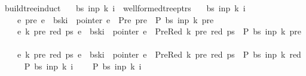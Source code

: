 \begin{isabellebody}
\isadelimproof
%
\endisadelimproof
%
\isatagproof
%
\endisatagproof
{\isafoldproof}%
%
\isadelimproof
\isanewline
%
\endisadelimproof
{}\isamarkupfalse%
\ build{\isacharunderscore}{\kern0pt}tree{\isacharprime}{\kern0pt}{\isacharunderscore}{\kern0pt}induct{\isacharcolon}{\kern0pt}\isanewline
\ \ \ {\isachardoublequoteopen}{\isacharparenleft}{\kern0pt}bs{\isacharcomma}{\kern0pt}\ inp{\isacharcomma}{\kern0pt}\ k{\isacharcomma}{\kern0pt}\ i{\isacharparenright}{\kern0pt}\ {\isasymin}\ wellformed{\isacharunderscore}{\kern0pt}tree{\isacharunderscore}{\kern0pt}ptrs{\isachardoublequoteclose}\isanewline
\ \ \ {\isachardoublequoteopen}{\isasymAnd}bs\ inp\ k\ i{\isachardot}{\kern0pt}\isanewline
\ \ \ \ {\isacharparenleft}{\kern0pt}{\isasymAnd}e\ pre{\isachardot}{\kern0pt}\ e\ {\isacharequal}{\kern0pt}\ bs{\isacharbang}{\kern0pt}k{\isacharbang}{\kern0pt}i\ {\isasymLongrightarrow}\ pointer\ e\ {\isacharequal}{\kern0pt}\ Pre\ pre\ {\isasymLongrightarrow}\ P\ bs\ inp\ {\isacharparenleft}{\kern0pt}k{\isacharminus}{\kern0pt}{}{\isacharparenright}{\kern0pt}\ pre{\isacharparenright}{\kern0pt}\ {\isasymLongrightarrow}\isanewline
\ \ \ \ {\isacharparenleft}{\kern0pt}{\isasymAnd}e\ k{\isacharprime}{\kern0pt}\ pre\ red\ ps{\isachardot}{\kern0pt}\ e\ {\isacharequal}{\kern0pt}\ bs{\isacharbang}{\kern0pt}k{\isacharbang}{\kern0pt}i\ {\isasymLongrightarrow}\ pointer\ e\ {\isacharequal}{\kern0pt}\ PreRed\ {\isacharparenleft}{\kern0pt}k{\isacharprime}{\kern0pt}{\isacharcomma}{\kern0pt}\ pre{\isacharcomma}{\kern0pt}\ red{\isacharparenright}{\kern0pt}\ ps\ {\isasymLongrightarrow}\ P\ bs\ inp\ k{\isacharprime}{\kern0pt}\ pre{\isacharparenright}{\kern0pt}\ {\isasymLongrightarrow}\isanewline
\ \ \ \ {\isacharparenleft}{\kern0pt}{\isasymAnd}e\ k{\isacharprime}{\kern0pt}\ pre\ red\ ps{\isachardot}{\kern0pt}\ e\ {\isacharequal}{\kern0pt}\ bs{\isacharbang}{\kern0pt}k{\isacharbang}{\kern0pt}i\ {\isasymLongrightarrow}\ pointer\ e\ {\isacharequal}{\kern0pt}\ PreRed\ {\isacharparenleft}{\kern0pt}k{\isacharprime}{\kern0pt}{\isacharcomma}{\kern0pt}\ pre{\isacharcomma}{\kern0pt}\ red{\isacharparenright}{\kern0pt}\ ps\ {\isasymLongrightarrow}\ P\ bs\ inp\ k\ red{\isacharparenright}{\kern0pt}\ {\isasymLongrightarrow}\isanewline
\ \ \ \ P\ bs\ inp\ k\ i{\isachardoublequoteclose}\ \isanewline
\ \ \ {\isachardoublequoteopen}P\ bs\ inp\ k\ i{\isachardoublequoteclose}%
\isadelimproof
%
\endisadelimproof
%
\isatagproof
%
\endisatagproof
{\isafoldproof}%
%
\isadelimproof
\isanewline
%
\endisadelimproof
{}\isamarkupfalse%

\end{isabellebody}
